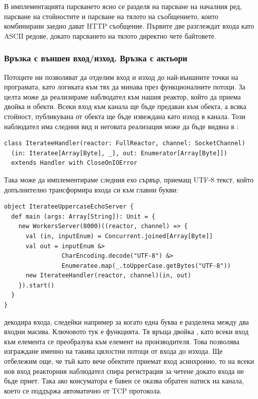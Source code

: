 В имплементацията парсването ясно се разделя на парсване на началния ред, парсване на  стойностите и парсване на тялото на съобщението, които комбинирани заедно дават HTTP съобщение. Първите две разглеждат входа като ASCII редове, докато парсването на тялото директно чете байтовете.

\subsubsection{Връзка с външен вход/изход. Връзка с актьори}

Потоците ни позволяват да отделим вход и изход до най-външните точки на програмата, като логиката към тях да минава през функционалните потоци. За целта може да реализираме наблюдател към нашия реактор, който да приема двойка  и  обекти. Всеки вход към канала ще бъде предаван към  обекта, а всяка стойност, публикувана от  обекта ще бъде извеждана като изход в канала. Този наблюдател има следния вид и неговата реализация може да бъде видяна в :

\begin{lstlisting}
class IterateeHandler(reactor: FullReactor, channel: SocketChannel)
  (in: Iteratee[Array[Byte], _], out: Enumerator[Array[Byte]])
  extends Handler with CloseOnIOError
\end{lstlisting}

Така може да имплементираме следния ехо сървър, приемащ UTF-8 текст, който допълнително трансформира входа си към главни букви:

\begin{lstlisting}
object IterateeUppercaseEchoServer {
  def main (args: Array[String]): Unit = {
    new WorkersServer(8000)((reactor, channel) => {
      val (in, inputEnum) = Concurrent.joined[Array[Byte]]
      val out = inputEnum &>
                CharEncoding.decode("UTF-8") &>
                Enumeratee.map(_.toUpperCase.getBytes("UTF-8"))
      new IterateeHandler(reactor, channel)(in, out)
    }).start()
  }
}
\end{lstlisting}

 декодира входа, следейки например за когато една буква е разделена между два входни масива. Ключовото тук е  функцията. Тя връща двойка , като всеки вход към  елемента се преобразува към елемент на  производителя. Това позволява изграждане именно на такива цялостни потоци от входа до изхода. Ще отбележим още, че тъй като вече  обектите приемат вход асинхронно, то на всеки нов вход реакторния наблюдател спира регистрация за четене докато входа не бъде приет. Така ако консуматора е бавен се оказва обратен натиск на канала, което се поддържа автоматично от TCP протокола.

